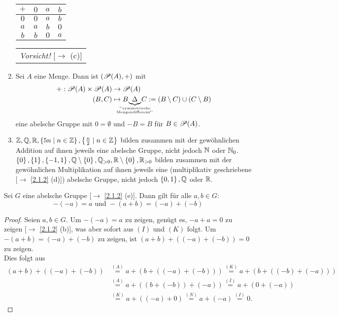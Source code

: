 \documentclass[../../main.tex]{subfiles}
\begin{document}
\begin{bsp}
\begin{enumerate}[\normalfont(a)]
\begin{table}[h]
\begin{tabular}{c|ccc}
 $+$ & $0$ & $a$ & $b$ \\\hline
 $0$ & $0$ & $a$ & $b$ \\
 $a$ & $a$ & $b$ & $0$ \\
 $b$ & $b$ & $0$ & $a$
\end{tabular} 
\begin{tabular}{c}
\emph{Vorsicht!} [$\rightarrow$ (c)]
\end{tabular}
\end{table}
\item Sei $A$ eine Menge. Dann ist $(\mathcal P(A),+)$ mit 
\begin{align*}
+:\Pow(A)\times \Pow(A) &\rightarrow\Pow(A)\\
(B,C) & \mapsto B\hspace{-2em}\underbrace{\Delta}_{\over{\text{"`symmetrische}}{\text{Mengendifferenz"'}}}\hspace{-2em}
C := (B\setminus C)\cup (C\setminus B)
\end{align*}
eine abelsche Gruppe mit $0=\emptyset$ und $-B = B$ für $B\in\mathcal P(A)$.
\item $\mathbb Z,\mathbb Q,\mathbb R,\left\{5n\mid n\in\mathbb Z\right\},\left\{\frac{n}{2}\mid n\in\mathbb Z\right\}$ bilden zusammen mit der gewöhnlichen Addition auf ihnen jeweils eine abelsche Gruppe, nicht jedoch $\mathbb N$ oder $\mathbb N_0$.\\
$\left\{0\right\}, \left\{1\right\}, \left\{-1,1\right\}, \mathbb Q\setminus\left\{0\right\}, \mathbb Q_{>0}, \mathbb R\setminus\left\{0\right\}, \mathbb R_{>0}$ bilden zusammen mit der gewöhnlichen Multiplikation auf ihnen jeweils eine (multiplikativ geschriebene [$\rightarrow$ \ref{2.1.2} (d)]) abelsche Gruppe, nicht jedoch $\left\{0,1\right\},\mathbb Q$ oder $\mathbb R$.
\end{enumerate}
\end{bsp}

\begin{pro}\label{2.1.4}
Sei $G$ eine abelsche Gruppe {\rm[$\rightarrow$ \ref{2.1.2} (e)]}. Dann gilt für alle $a,b\in G$:
$$-(-a)=a\text{ und }-(a+b)=(-a)+(-b)$$
\end{pro}
\begin{proof}
Seien $a,b\in G$. Um $-(-a)=a$ zu zeigen, genügt es, $-a+a=0$ zu zeigen [$\rightarrow$ \ref{2.1.2} (b)], was aber sofort aus $(I)$ und $(K)$ folgt. Um $-(a+b)=(-a)+(-b)$ zu zeigen, ist $(a+b)+((-a)+(-b))=0$ zu zeigen.\\
Dies folgt aus
\begin{align*}
(a+b)+((-a)+(-b)) &\overset{(A)}= a+(b+((-a)+(-b)))\overset{(K)}=a+(b+((-b)+(-a)))\\
& \overset{(A)}=a+((b+(-b))+(-a))\overset{(I)}=a+(0+(-a))\\
&\overset{(K)}=a+((-a)+0)\overset{(N)}= a+(-a)\overset{(I)}=0.
\end{align*}
\end{proof}
\end{document}
